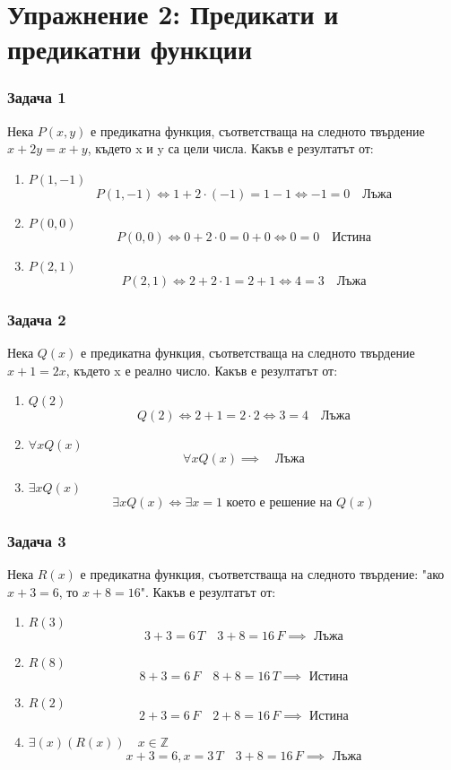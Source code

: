 \documentclass[fleqn, 12pt]{article}
\theoremstyle{definition}
\begin{document}
\newpage
\section{Упражнение 2: Предикати и предикатни функции}

\subsubsection*{Задача 1}
Нека $P(x,y)$ е  предикатна  функция,  съответстваща  на  следното твърдение $x + 2y = x+y$, където x и y са цели числа.  Какъв е резултатът от:
\begin{enumerate}
\item $P(1,-1)$
$$P(1,-1) \Leftrightarrow 1 + 2 \cdot (-1) = 1 - 1  \Leftrightarrow -1 = 0 \quad \text{Лъжа}$$  
\item $P(0,0)$
$$P(0,0) \Leftrightarrow 0 + 2 \cdot 0= 0 + 0  \Leftrightarrow 0 = 0 \quad \text{Истина}$$  
\item $P(2,1)$
$$P(2,1) \Leftrightarrow 2 + 2 \cdot 1 = 2 + 1 \Leftrightarrow 4 = 3 \quad \text{Лъжа}$$  
\end{enumerate}

\subsubsection*{Задача 2}
Нека $Q(x)$ е предикатна функция, съответстваща на следното твърдение $x+1 = 2x$, където x е реално число.  Какъв е резултатът от:
\begin{enumerate}
\item $Q(2)$
$$Q(2) \Leftrightarrow 2+1 = 2 \cdot 2 \Leftrightarrow 3 = 4 \quad \text{Лъжа}$$  
\item $\forall x Q(x)$
$$\forall x Q(x) \implies \quad \text{Лъжа}$$  
\item $\exists x Q(x)$
$$\exists x Q(x) \Leftrightarrow \exists x = 1 \text{ което е решение на } Q(x)$$  
\end{enumerate}

\subsubsection*{Задача 3}
Нека $R(x)$ е предикатна функция, съответстваща на следното твърдение: "ако $x+3 = 6$, то $x + 8 = 16$". Какъв е резултатът от:
\begin{enumerate}
\item $R(3)$
$$3 + 3 = 6 \, T \quad 3+8 = 16 \, F \implies \text{ Лъжа}$$  
\item $R(8)$
$$8 + 3 = 6 \, F \quad 8+8 = 16 \, T \implies \text{ Истина}$$  
\item $R(2)$
$$2 + 3 = 6 \, F \quad 2+8 = 16 \, F \implies \text{ Истина}$$  
\item $\exists (x)(R(x)) \quad x \in \mathbb{Z}$
$$x + 3 = 6, x=3 \, T \quad 3+8 = 16 \, F \implies \text{ Лъжа}$$  
\end{enumerate}
\end{document}
